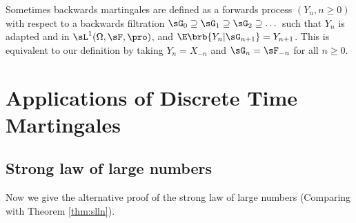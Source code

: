 \begin{remark}
Sometimes backwards martingales are defined as a forwards process $(Y_n, n \geq 0)$ with respect to a backwards filtration $\sG_0 \supseteq \sG_1 \supseteq \sG_2 \supseteq \dots$ such that $Y_n$ is adapted and in $\sL^1(\Omega,\sF,\pro)$, and $\E\brb{Y_n | \sG_{n+1}} = Y_{n+1}$. This is equivalent to our definition by taking $Y_n = X_{-n}$ and $\sG_n = \sF_{-n}$ for all $n \geq 0$.
\end{remark}


\section{Applications of Discrete Time Martingales}


\subsection{Strong law of large numbers}

Now we give the alternative proof of the strong law of large numbers (Comparing with Theorem \ref{thm:slln}).







